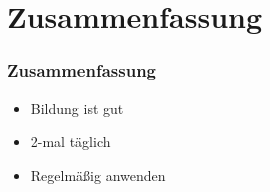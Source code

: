 \section{Zusammenfassung}

\begin{frame}
	\frametitle{Zusammenfassung}
	\begin{itemize}
		\item Bildung ist gut
		\item 2-mal täglich
		\item Regelmäßig anwenden
	\end{itemize}
\end{frame}
